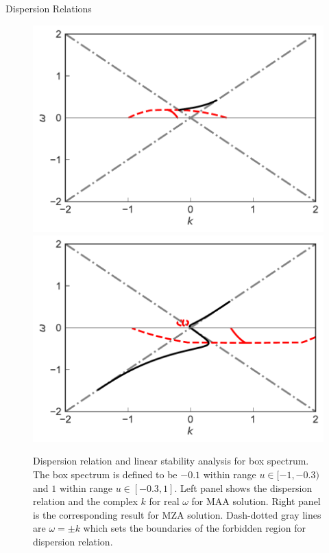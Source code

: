 \documentclass[9pt]{beamer}
\begin{document}
\begin{darkframes}
\begin{frame}{Dispersion Relations}
   \begin{figure}
      \includegraphics[width=\linewidth]{assets/dr/spectBoxC1MAADRPltBlob.pdf}
      \endminipage\hfill
      \includegraphics[width=\linewidth]{assets/dr/spectBoxC1MZADRPltBlob.pdf}
      \endminipage\hfill
      \caption*{Dispersion relation and linear stability analysis for box spectrum. The box spectrum is defined to be $-0.1$ within range $u\in [-1,-0.3)$ and $1$ within range $u\in [-0.3,1]$. Left panel shows the dispersion relation and the complex $k$ for real $\omega$ for MAA solution. Right panel is the corresponding result for MZA solution. Dash-dotted gray lines are $\omega= \pm k$ which sets the boundaries of the forbidden region for dispersion relation.
       }
   \end{figure}




\end{frame}
\end{darkframes}
\end{document}
